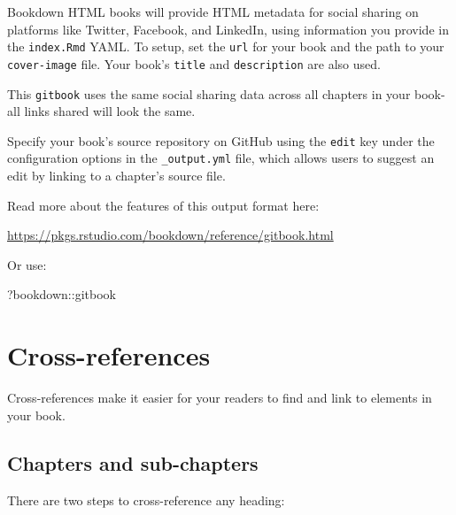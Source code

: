 \documentclass[
]{book}
\newenvironment{Shaded}{\begin{snugshade}}{\end{snugshade}}
\newcommand{\NormalTok}[1]{#1}
\newcommand{\SpecialCharTok}[1]{\textcolor[rgb]{0.00,0.00,0.00}{#1}}
\theoremstyle{definition}
\theoremstyle{definition}
\theoremstyle{definition}
\theoremstyle{definition}
\theoremstyle{remark}
\begin{document}
Bookdown HTML books will provide HTML metadata for social sharing on platforms like Twitter, Facebook, and LinkedIn, using information you provide in the \texttt{index.Rmd} YAML. To setup, set the \texttt{url} for your book and the path to your \texttt{cover-image} file. Your book's \texttt{title} and \texttt{description} are also used.

This \texttt{gitbook} uses the same social sharing data across all chapters in your book- all links shared will look the same.

Specify your book's source repository on GitHub using the \texttt{edit} key under the configuration options in the \texttt{\_output.yml} file, which allows users to suggest an edit by linking to a chapter's source file.

Read more about the features of this output format here:

\url{https://pkgs.rstudio.com/bookdown/reference/gitbook.html}

Or use:

\begin{Shaded}
\begin{Highlighting}[]
\NormalTok{?bookdown}\SpecialCharTok{::}\NormalTok{gitbook}
\end{Highlighting}
\end{Shaded}

\hypertarget{cross}{%
\chapter{Cross-references}\label{cross}}

Cross-references make it easier for your readers to find and link to elements in your book.

\hypertarget{chapters-and-sub-chapters}{%
\section{Chapters and sub-chapters}\label{chapters-and-sub-chapters}}

There are two steps to cross-reference any heading:
\end{document}
